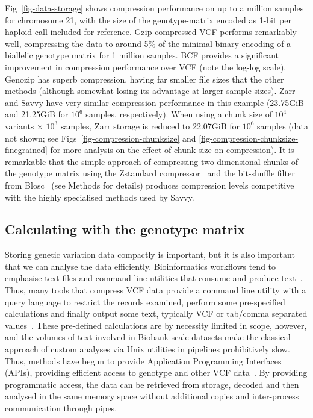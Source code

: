 \documentclass[a4paper,num-refs]{oup-contemporary}
\begin{document}
Fig~\ref{fig-data-storage} shows compression performance 
on up to a million samples for chromosome 21, with 
the size of the genotype-matrix encoded as 1-bit per haploid
call included for reference.
Gzip compressed VCF performs remarkably well, compressing 
the data to around 5\% of the 
minimal binary encoding of a biallelic genotype matrix
for 1 million samples. 
BCF provides a significant improvement in compression
performance over VCF (note the log-log scale). Genozip has 
superb compression, having far smaller file sizes that the 
other methods (although somewhat losing its advantage at 
larger sample sizes). Zarr and Savvy have 
very similar compression performance in this example (23.75GiB
and 21.25GiB for $10^6$ samples, respectively). When using
a chunk size of $10^4$ variants $\times$ $10^3$ samples, Zarr
storage is reduced to 22.07GiB for $10^6$ samples (data not shown;
see Figs~\ref{fig-compression-chunksize} and \ref{fig-compression-chunksize-finegrained}
for more analysis on the effect of chunk size on compression).
It is remarkable that the simple approach of compressing
two dimensional chunks of the genotype matrix 
using the Zstandard compressor~\citep{collet2021rfc} and the 
bit-shuffle filter from Blosc~\cite{alted2010modern} 
(see Methods for details) produces 
compression levels competitive with the highly specialised methods
used by Savvy.

\subsection{Calculating with the genotype matrix}
Storing genetic variation data compactly is important, but it is also
important that we can analyse the data efficiently. Bioinformatics 
workflows tend to emphasise text files and command line utilities 
that consume and produce text~\citep[e.g.][]{buffalo2015bioinformatics}. 
Thus, many tools that compress VCF data provide a command line 
utility with a query language to restrict the records
examined, perform some pre-specified calculations and finally 
output some text, typically VCF or tab/comma separated 
values~\citep{
layer2016efficient, %
li2016bgt, %
danek2018gtc, %
lin2020sparse, %
lan2020genozip,lan2021genozip, %
zhang2023gbc}. %
These pre-defined calculations are by necessity limited in scope, however,
and the volumes of text involved in Biobank scale datasets
make the classical approach of custom
analyses via Unix utilities in pipelines prohibitively slow. Thus, 
methods have begun to provide Application Programming Interfaces
(APIs), providing efficient access to genotype and other VCF 
data~\cite[e.g.][]{kelleher2013processing,lefaive2021sparse,
wertenbroek2022xsi}. By providing programmatic access,
the data can be retrieved from storage, decoded and then analysed
in the same memory space without additional copies and 
inter-process communication through pipes.
\end{document}
